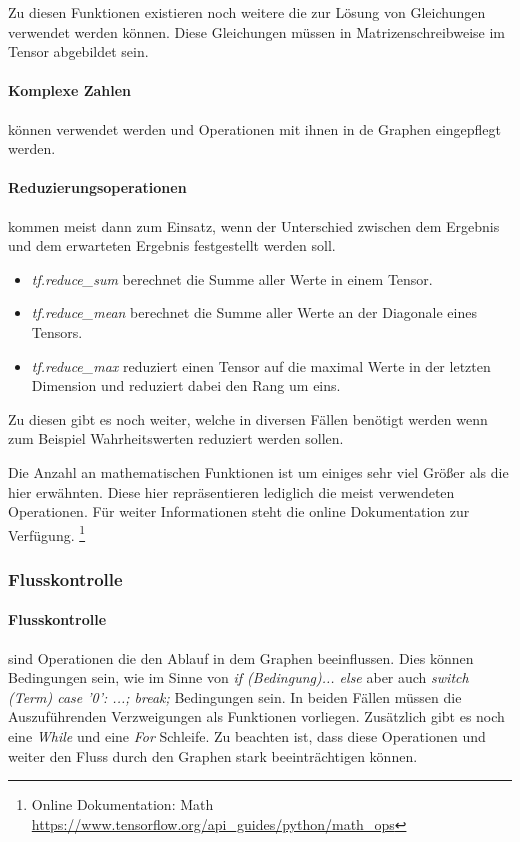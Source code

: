 Zu diesen Funktionen existieren noch weitere die zur Lösung von Gleichungen verwendet werden können. 
Diese Gleichungen müssen in Matrizenschreibweise im Tensor abgebildet sein. 

\paragraph{Komplexe Zahlen} können verwendet werden und Operationen mit ihnen in de Graphen eingepflegt werden. 

\paragraph{Reduzierungsoperationen} kommen meist dann zum Einsatz, wenn der Unterschied zwischen dem Ergebnis und dem erwarteten Ergebnis festgestellt werden soll. 
\begin{itemize}
	\item \textit{tf.reduce\_sum} berechnet die Summe aller Werte in einem Tensor.
	\item \textit{tf.reduce\_mean} berechnet die Summe aller Werte an der Diagonale eines Tensors. 
	\item \textit{tf.reduce\_max} reduziert einen Tensor auf die maximal Werte in der letzten Dimension und reduziert dabei den Rang um eins.
\end{itemize}

\noindent
Zu diesen gibt es noch weiter, welche in diversen Fällen benötigt werden wenn zum Beispiel Wahrheitswerten reduziert werden sollen. \newline

\noindent
Die Anzahl an mathematischen Funktionen ist um einiges sehr viel Größer als die hier erwähnten. 
Diese hier repräsentieren lediglich die meist verwendeten Operationen. 
Für weiter Informationen steht die online Dokumentation zur Verfügung. \footnote{Online Dokumentation: Math \url{https://www.tensorflow.org/api_guides/python/math_ops}}

\subsubsection{Flusskontrolle}

\paragraph{Flusskontrolle} sind Operationen die den Ablauf in dem Graphen beeinflussen. 
Dies können Bedingungen sein, wie im Sinne von \textit{if (Bedingung){...} else {}} aber auch \textit{switch (Term) { case '0': ...; break;}} Bedingungen sein. 
In beiden Fällen müssen die Auszuführenden Verzweigungen als Funktionen vorliegen. 
Zusätzlich gibt es noch eine \textit{While} und eine \textit{For} Schleife. 
Zu beachten ist, dass diese Operationen und weiter den Fluss durch den Graphen stark beeinträchtigen können.

